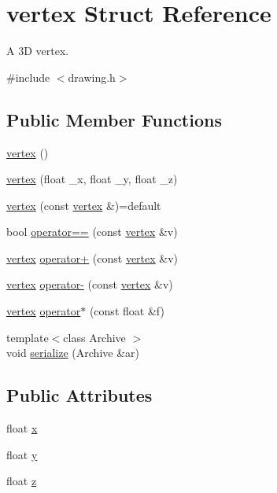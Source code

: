 \hypertarget{structvertex}{}\section{vertex Struct Reference}
\label{structvertex}


A 3D vertex.  




{\ttfamily \#include $<$drawing.\+h$>$}

\subsection*{Public Member Functions}
\begin{DoxyCompactItemize}
\item 
\hyperlink{structvertex_ae32be8790fc66fcc4898cf794f915da0}{vertex} ()
\item 
\hyperlink{structvertex_ab215a18712ffe9cab97647e6ad79aee4}{vertex} (float \+\_\+x, float \+\_\+y, float \+\_\+z)
\item 
\hyperlink{structvertex_a3d165d369c193e574e3dec05e269421f}{vertex} (const \hyperlink{structvertex}{vertex} \&)=default
\item 
bool \hyperlink{structvertex_adb0fd95b21c7807fc905a105e1f3b869}{operator==} (const \hyperlink{structvertex}{vertex} \&v)
\item 
\hyperlink{structvertex}{vertex} \hyperlink{structvertex_a510b7dbb1cbccb470356c03a18162de2}{operator+} (const \hyperlink{structvertex}{vertex} \&v)
\item 
\hyperlink{structvertex}{vertex} \hyperlink{structvertex_a8429f16b8a2b8330cb41b3db4bce72ec}{operator-\/} (const \hyperlink{structvertex}{vertex} \&v)
\item 
\hyperlink{structvertex}{vertex} \hyperlink{structvertex_ab6d26dba0518489732009a262c97db0e}{operator$\ast$} (const float \&f)
\item 
{\footnotesize template$<$class Archive $>$ }\\void \hyperlink{structvertex_a339811fa5d720f6183465d4c28248a01}{serialize} (Archive \&ar)
\end{DoxyCompactItemize}
\subsection*{Public Attributes}
\begin{DoxyCompactItemize}
\item 
float \hyperlink{structvertex_a664a5bbbbca4e1a99d85a163f6a08405}{x}
\item 
float \hyperlink{structvertex_aea3246afd0395032be285a49bcd4b146}{y}
\item 
float \hyperlink{structvertex_afe9862f7d3456ee2d352d94cbe5a84da}{z}
\end{DoxyCompactItemize}


